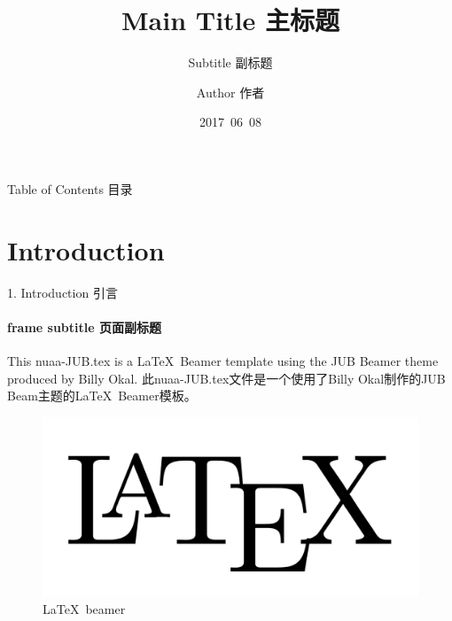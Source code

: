 \documentclass[CJKutf8]{beamer}
\begin{document}
\begin{CJK*}{UTF8}{gbsn} %

  \title{Main Title 主标题}
  \subtitle{Subtitle 副标题} %
  \author{Author 作者}
  \date{2017\ 06\ 08}

  \begin{frame}[plain,t]
    \titlepage
  \end{frame} %
  
  \begin{frame}{Table of Contents 目录}
    \tableofcontents
  \end{frame} %
  
  \section{Introduction}
  \label{Sec:introduction}
  \begin{frame}{1. Introduction 引言}
    \framesubtitle{frame subtitle 页面副标题}
    This nuaa-JUB.tex is a \LaTeX \ Beamer template using the JUB Beamer theme \cite{JUBTheme} produced by Billy Okal.
    \bigskip
    此nuaa-JUB.tex文件是一个使用了Billy Okal制作的JUB Beam主题\cite{JUBTheme}的\LaTeX \ Beamer模板。

    \begin{figure}
      \begin{center}
        \includegraphics[scale=0.1]{latex.png}
      \end{center}
      \caption{\LaTeX \ beamer}
      \label{Fig:latex_beamer}
    \end{figure}
  \end{frame} %


\end{CJK*}
\end{document}
